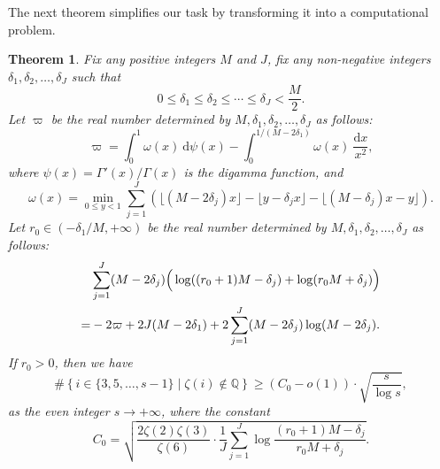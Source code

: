 \documentclass[12pt]{article}
\newtheorem{theorem}{Theorem}[section]
\numberwithin{equation}{section}
\begin{document}
\bigskip

The next theorem simplifies our task by transforming it into a computational problem.

\begin{theorem}\label{final_lemma}
Fix any positive integers $M$ and $J$, fix any non-negative integers $\delta_1,\delta_2,\ldots,\delta_J$ such that 
\[ 0 \leqslant \delta_1 \leqslant \delta_2 \leqslant \cdots \leqslant \delta_J < \frac{M}{2}. \]
Let $\varpi$ be the real number determined by $M,\delta_1,\delta_2,\ldots,\delta_J$ as follows:
\[ \varpi = \int_{0}^{1} \omega(x)~\mathrm{d}\psi(x) - \int_{0}^{1/(M-2\delta_1)} \omega(x)~\frac{\mathrm{d}x}{x^2},  \]
where $\psi(x) = \Gamma'(x)/\Gamma(x)$ is the digamma function, and
\[ \omega(x) = \min_{0 \leqslant y < 1} \sum_{j=1}^{J}  \left( \lfloor(M-2\delta_j)x\rfloor - \lfloor y-\delta_j x \rfloor - \lfloor (M-\delta_j)x - y \rfloor \right). \]
Let $r_0 \in (-\delta_1/M, +\infty)$ be the real number determined by $M,\delta_1,\delta_2,\ldots,\delta_J$ as follows:
\begin{align}
&\sum_{j=1}^{J} (M-2\delta_j) \Big( \log((r_0+1)M-\delta_j) + \log(r_0M+\delta_j) \Big)  \notag\\
=& -2\varpi + 2J(M-2\delta_1) + 2\sum_{j=1}^{J}  (M-2\delta_j)\log(M-2\delta_j). \label{def_r_0}
\end{align}
If $r_0 > 0$, then we have
\[ \# \left\{  i \in \{3,5,\ldots,s-1\}  \mid  \zeta(i) \not\in \mathbb{Q} \right\}  \geqslant (C_0-o(1)) \cdot \sqrt{\frac{s}{\log s}},  \]
as the even integer $s \to +\infty$, where the constant 
\[ C_0 = \sqrt{\frac{2\zeta(2)\zeta(3)}{\zeta(6)} \cdot \frac{1}{J}\sum_{j=1}^{J} \log \frac{(r_0+1)M - \delta_j}{r_0M + \delta_j}  }. \]
\end{theorem}
\end{document}

